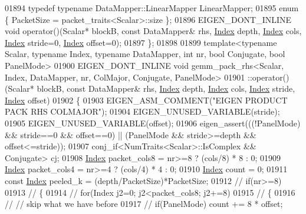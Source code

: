 \begin{DoxyCode}
01894   \textcolor{keyword}{typedef} \textcolor{keyword}{typename} DataMapper::LinearMapper LinearMapper;
01895   \textcolor{keyword}{enum} \{ PacketSize = packet\_traits<Scalar>::size \};
01896   EIGEN\_DONT\_INLINE \textcolor{keywordtype}{void} operator()(Scalar* blockB, \textcolor{keyword}{const} DataMapper& rhs, \hyperlink{namespace_eigen_a62e77e0933482dafde8fe197d9a2cfde}{Index} depth, 
      \hyperlink{namespace_eigen_a62e77e0933482dafde8fe197d9a2cfde}{Index} cols, \hyperlink{namespace_eigen_a62e77e0933482dafde8fe197d9a2cfde}{Index} stride=0, \hyperlink{namespace_eigen_a62e77e0933482dafde8fe197d9a2cfde}{Index} offset=0);
01897 \};
01898 
01899 \textcolor{keyword}{template}<\textcolor{keyword}{typename} Scalar, \textcolor{keyword}{typename} Index, \textcolor{keyword}{typename} DataMapper, \textcolor{keywordtype}{int} nr, \textcolor{keywordtype}{bool} Conjugate, \textcolor{keywordtype}{bool} PanelMode>
01900 EIGEN\_DONT\_INLINE \textcolor{keywordtype}{void} gemm\_pack\_rhs<Scalar, Index, DataMapper, nr, ColMajor, Conjugate, PanelMode>
01901   ::operator()(Scalar* blockB, \textcolor{keyword}{const} DataMapper& rhs, \hyperlink{namespace_eigen_a62e77e0933482dafde8fe197d9a2cfde}{Index} depth, \hyperlink{namespace_eigen_a62e77e0933482dafde8fe197d9a2cfde}{Index} cols, 
      \hyperlink{namespace_eigen_a62e77e0933482dafde8fe197d9a2cfde}{Index} stride, \hyperlink{namespace_eigen_a62e77e0933482dafde8fe197d9a2cfde}{Index} offset)
01902 \{
01903   EIGEN\_ASM\_COMMENT(\textcolor{stringliteral}{"EIGEN PRODUCT PACK RHS COLMAJOR"});
01904   EIGEN\_UNUSED\_VARIABLE(stride);
01905   EIGEN\_UNUSED\_VARIABLE(offset);
01906   eigen\_assert(((!PanelMode) && stride==0 && offset==0) || (PanelMode && stride>=depth && offset<=stride));
01907   conj\_if<NumTraits<Scalar>::IsComplex && Conjugate> cj;
01908   \hyperlink{namespace_eigen_a62e77e0933482dafde8fe197d9a2cfde}{Index} packet\_cols8 = nr>=8 ? (cols/8) * 8 : 0;
01909   \hyperlink{namespace_eigen_a62e77e0933482dafde8fe197d9a2cfde}{Index} packet\_cols4 = nr>=4 ? (cols/4) * 4 : 0;
01910   \hyperlink{namespace_eigen_a62e77e0933482dafde8fe197d9a2cfde}{Index} count = 0;
01911   \textcolor{keyword}{const} \hyperlink{namespace_eigen_a62e77e0933482dafde8fe197d9a2cfde}{Index} peeled\_k = (depth/PacketSize)*PacketSize;
01912 \textcolor{comment}{//   if(nr>=8)}
01913 \textcolor{comment}{//   \{}
01914 \textcolor{comment}{//     for(Index j2=0; j2<packet\_cols8; j2+=8)}
01915 \textcolor{comment}{//     \{}
01916 \textcolor{comment}{//       // skip what we have before}
01917 \textcolor{comment}{//       if(PanelMode) count += 8 * offset;}

\end{DoxyCode}
